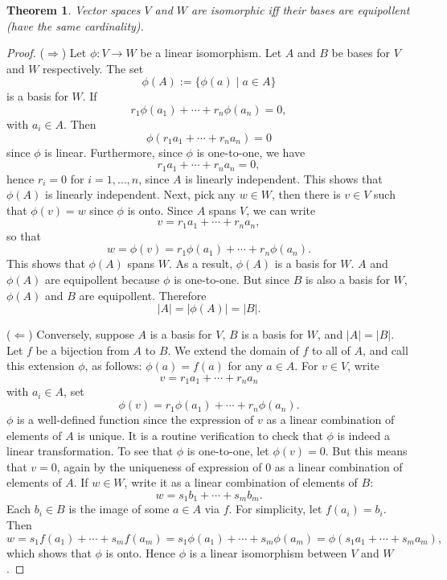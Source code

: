 \documentclass[12pt]{article}
\newtheorem{thm}{Theorem}
\begin{document}
\begin{thm} Vector spaces $V$ and $W$ are isomorphic iff their bases are equipollent (have the same cardinality). \end{thm}

\begin{proof}  ($\Longrightarrow$)  Let $\phi:V\to W$ be a linear isomorphism.  Let $A$ and $B$ be bases for $V$ and $W$ respectively.  The set $$\phi(A):=\lbrace \phi(a)\mid a\in A\rbrace$$ is a basis for $W$.  If $$r_1\phi(a_1)+\cdots +r_n\phi(a_n)=0,$$ with $a_i\in A$.  Then $$\phi(r_1a_1+\cdots +r_na_n)=0$$ since $\phi$ is linear.  Furthermore, since $\phi$ is one-to-one, we have $$r_1a_1+\cdots +r_na_n=0,$$ hence $r_i=0$ for $i=1,\ldots, n$, since $A$ is linearly independent.  This shows that $\phi(A)$ is linearly independent.  Next, pick any $w\in W$, then there is $v\in V$ such that $\phi(v)=w$ since $\phi$ is onto.  Since $A$ spans $V$, we can write $$v=r_1a_1+\cdots + r_na_n,$$ so that $$w=\phi(v)=r_1\phi(a_1)+\cdots +r_n\phi(a_n).$$  This shows that $\phi(A)$ spans $W$.  As a result, $\phi(A)$ is a basis for $W$.  $A$ and $\phi(A)$ are equipollent because $\phi$ is one-to-one.  But since $B$ is also a basis for $W$, $\phi(A)$ and $B$ are equipollent.  Therefore $$|A|=|\phi(A)| = |B|.$$

($\Longleftarrow$)  Conversely, suppose $A$ is a basis for $V$, $B$ is a basis for $W$, and $|A|=|B|$.  Let $f$ be a bijection from $A$ to $B$.  We extend the domain of $f$ to all of $A$, and call this extension $\phi$, as follows: $\phi(a)=f(a)$ for any $a\in A$.  For $v\in V$, write $$v=r_1a_1+\cdots +r_na_n$$ with $a_i\in A$, set $$\phi(v)=r_1\phi(a_1)+\cdots +r_n\phi(a_n).$$  $\phi$ is a well-defined function since the expression of $v$ as a linear combination of elements of $A$ is unique.  It is a routine verification to check that $\phi$ is indeed a linear transformation.  To see that $\phi$ is one-to-one, let $\phi(v)=0$.  But this means that $v=0$, again by the uniqueness of expression of $0$ as a linear combination of elements of $A$.  If $w\in W$, write it as a linear combination of elements of $B$: $$w=s_1b_1+\cdots +s_mb_m.$$  Each $b_i\in B$ is the image of some $a\in A$ via $f$.  For simplicity, let $f(a_i)=b_i$.  Then $$w=s_1f(a_1)+\cdots + s_mf(a_m) = s_1\phi(a_1)+ \cdots + s_m \phi(a_m) = \phi(s_1a_1+\cdots +s_ma_m),$$ which shows that $\phi$ is onto.  Hence $\phi$ is a linear isomorphism between $V$ and $W$.
\end{proof}
\end{document}
